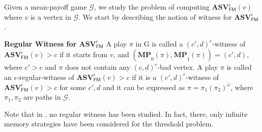 Given a mean-payoff game $\mathcal{G}$, we study the problem of computing $\mathbf{ASV}^{\epsilon}_{\mathsf{FM}}(v)$ where $v$ is a vertex in $\mathcal{G}$. We start by describing the notion of witness for $\mathbf{ASV}^{\epsilon}_{\mathsf{FM}}$.

\noindent\textbf{Regular Witness for $\mathbf{ASV}^{\epsilon}_{\mathsf{FM}}$} A play $\pi$ in G is called a $(c',d)^{\epsilon}$-witness of $\mathbf{ASV}_{\mathsf{FM}}^{\epsilon}(v) > c$ if it starts from $v$, and $(\underline{\mathbf{MP}}_0(\pi), \underline{\mathbf{MP}}_1(\pi)) = (c', d)$, where $c' > c$ and $\pi$ does not contain any $(c,d)^{\epsilon}$-bad vertex. 
A play $\pi$ is called an $\epsilon$-regular-witness of $\mathbf{ASV}_{\mathsf{FM}}^{\epsilon}(v) > c$ if it is a $(c',d)^{\epsilon}$-witness of $\mathbf{ASV}_{\mathsf{FM}}^{\epsilon}(v) > c$ for some $c',d$ and it can be expressed as $\pi = \pi_1 (\pi_2)^{\omega}$, where $\pi_1, \pi_2$ are paths in $\mathcal{G}$.

Note that in \cite{FGR20}, no regular witness has been studied. In fact, there, only infinite memory strategies have been considered for the threshold problem.

